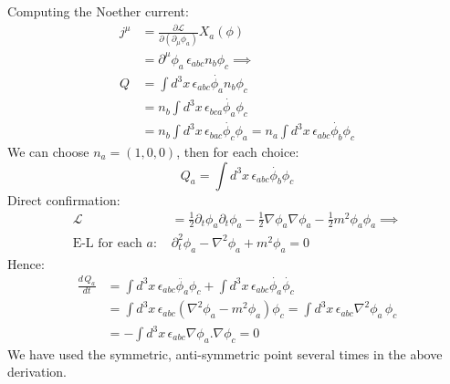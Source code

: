 \documentclass{article}
\newcommand{\pd}{\partial}  %
\newcommand{\pdm}{\partial_\mu}  %
\newcommand{\pdup}{\partial^\mu}  %
\newcommand{\Lag}{\mathcal{L}}  %
\newcommand{\onehalf}{\frac{1}{2}}
\begin{document}
Computing the Noether current:
\begin{equation}
    \begin{split}
        j^\mu & = \frac{\pd\Lag}{\pd(\pdm \phi_a)}X_a(\phi) \\
        & = \pdup\phi_a \, \epsilon_{abc}n_b\phi_c \implies \\
        Q & = \int d^3x \, \epsilon_{abc} \dot{\phi_a} n_b \phi_c \\
        & =  n_b \int d^3x \,\epsilon_{bca} \dot{\phi_a} \phi_c \\ 
        & = n_b \int d^3x \, \epsilon_{bac} \dot{\phi_c} \phi_a = n_a \int d^3x \, 
        \epsilon_{abc} \dot{\phi_b} \phi_c 
    \end{split}
\end{equation}
We can choose $n_a = (1,0,0)$, then for each choice:
\begin{equation}
    Q_a = \int d^3x \, 
    \epsilon_{abc} \dot{\phi_b} \phi_c 
\end{equation}
Direct confirmation:
\begin{equation}
    \begin{split}
        \Lag & = \onehalf\pd_t\phi_a\pd_t\phi_a - \onehalf\nabla \phi_a\nabla\phi_a-\onehalf m^2\phi_a\phi_a \implies \\
        \text{E-L for each $a$: } & \pd_t^2 \phi_a - \nabla^2\phi_a + m^2\phi_a = 0 
    \end{split}
\end{equation} 
Hence:
\begin{equation}
    \begin{split}
        \frac{d \, Q_a}{dt} & = \int d^3x \, \epsilon_{abc}\ddot{\phi_a}\phi_c + \int  
        d^3x \, \epsilon_{abc}\dot{\phi_a}\dot{\phi_c}  \\
        & = \int d^3x \, \epsilon_{abc}(\nabla^2 \phi_a - m^2\phi_a)\phi_c = 
         \int d^3x \, \epsilon_{abc} \nabla^2 \phi_a \, \phi_c \\
         & = - \int d^3x \, \epsilon_{abc} \nabla\phi_a.\nabla\phi_c = 0
    \end{split}
\end{equation}
We have used the symmetric, anti-symmetric point several times in the above derivation.
\end{document}

